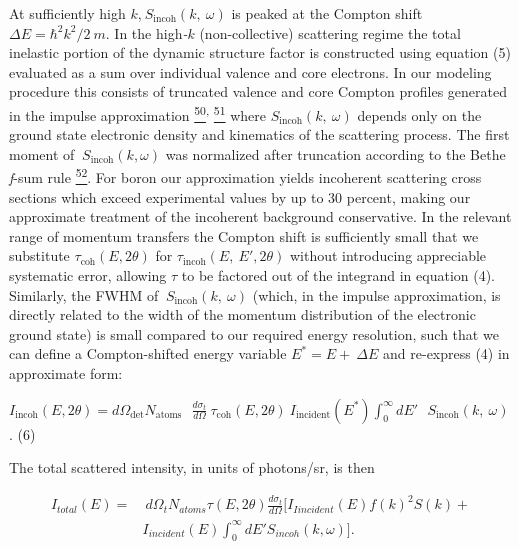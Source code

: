 At sufficiently high
\(k\),\(\ S_{\text{incoh}}\left( k,\ \omega \right)\) is peaked at the
Compton shift \(\Delta E = \hbar^{2}k^{2}/2\ m\). In the high\emph{-}\(k\)
(non-collective) scattering regime the total inelastic portion of the
dynamic structure factor is constructed using equation (5) evaluated as
a sum over individual valence and core electrons. In our modeling
procedure this consists of truncated valence and core Compton profiles
generated in the impulse approximation
\hyperref[w.-schuelke-electron-dynamics-by-inelastic-x-ray-scattering-oxford-university-press-new-york-2007.]{\textsuperscript{50}}\textsuperscript{,}
\hyperref[p.-eisenberger-and-p.-m.-platzman-physical-review-a-2-415-1970.]{\textsuperscript{51}}
where \(S_{\text{incoh}}\left( k,\ \omega \right)\) depends only on the
ground state electronic density and kinematics of the scattering
process. The first moment of
\(\ S_{\text{incoh}}\left( k,\omega \right)\) was normalized after
truncation according to the Bethe \emph{f}-sum rule
\hyperref[b.-a.-mattern-g.-t.-seidler-j.-j.-kas-j.-i.-pacold-and-j.-j.-rehr-physical-review-b-85-115135-2012.]{\textsuperscript{52}}.
For boron our approximation yields incoherent scattering cross sections
which exceed experimental values by up to 30 percent, making our
approximate treatment of the incoherent background conservative. In the
relevant range of momentum transfers the Compton shift is sufficiently
small that we substitute \(\tau_{\text{coh}}\left( E,2\theta \right)\)
for \(\tau_{\text{incoh}}\left( E,\ E',2\theta \right)\) without
introducing appreciable systematic error, allowing \(\tau\) to be
factored out of the integrand in equation (4). Similarly, the FWHM of
\(\ S_{\text{incoh}}\left( k,\ \omega \right)\) (which, in the impulse
approximation, is directly related to the width of the momentum
distribution of the electronic ground state) is small compared to our
required energy resolution, such that we can define a Compton-shifted
energy variable \(E^{*} = E + \ \Delta E\) and re-express (4) in
approximate form:

\(I_{\text{incoh}}\left( E,2\theta \right) = d\Omega_{\det}N_{\text{atoms}}\text{\ \ }\frac{d\sigma_{t}}{d\Omega}\ \tau_{\text{coh}}\left( E,2\theta \right)\ I_{\text{incident}}\left( E^{*} \right)\int_{0}^{\infty}{dE'}\text{\ \ }S_{\text{incoh}}\left( k,\ \omega \right)\).
(6)

The total scattered intensity, in units of photons/sr, is then

\begin{equation}
\begin{aligned}
I_{total}(E) = &~d\Omega_{t} N_{atoms} \tau(E, 2\theta) \frac{d\sigma_t}{d\Omega} [I_{Iincident}(E) f(k)^2 S(k) +\\
& I_{incident}(E) \int_0^\infty dE' S_{incoh}(k, \omega)].
\end{aligned}
\end{equation}

